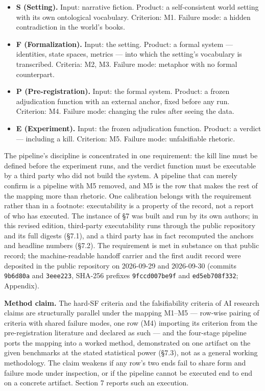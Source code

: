 \documentclass[11pt,a4paper]{article}
\begin{document}
\begin{itemize}[leftmargin=1.6em,itemsep=2pt,parsep=0pt,topsep=3pt]
\item \textbf{S (Setting).} Input: narrative fiction. Product: a self-consistent world setting with its own ontological vocabulary. Criterion: M1. Failure mode: a hidden contradiction in the world's books.
\item \textbf{F (Formalization).} Input: the setting. Product: a formal system — identities, state spaces, metrics — into which the setting's vocabulary is transcribed. Criteria: M2, M3. Failure mode: metaphor with no formal counterpart.
\item \textbf{P (Pre-registration).} Input: the formal system. Product: a frozen adjudication function with an external anchor, fixed before any run. Criterion: M4. Failure mode: changing the rules after seeing the data.
\item \textbf{E (Experiment).} Input: the frozen adjudication function. Product: a verdict — including a kill. Criterion: M5. Failure mode: unfalsifiable rhetoric.
\end{itemize}

The pipeline's discipline is concentrated in one requirement: the kill line must be defined before the experiment runs, and the verdict function must be executable by a third party who did not build the system. A pipeline that can merely confirm is a pipeline with M5 removed, and M5 is the row that makes the rest of the mapping more than rhetoric. One calibration belongs with the requirement rather than in a footnote: executability is a property of the record, not a report of who has executed. The instance of §7 was built and run by its own authors; in this revised edition, third-party executability runs through the public repository and its full digests (§7.1), and a third party has in fact recomputed the anchors and headline numbers (§7.2). The requirement is met in substance on that public record; the machine-readable handoff carrier and the first audit record were deposited in the public repository on 2026-09-29 and 2026-09-30 (commits \texttt{9b6d80a} and \texttt{3eee223}, SHA-256 prefixes \texttt{9fccd007be9f} and \texttt{ed5eb708f332}; Appendix).

\textbf{Method claim.} The hard-SF criteria and the falsifiability criteria of AI research claims are structurally parallel under the mapping M1–M5 — row-wise pairing of criteria with shared failure modes, one row (M4) importing its criterion from the pre-registration literature and declared as such — and the four-stage pipeline ports the mapping into a worked method, demonstrated on one artifact on the given benchmarks at the stated statistical power (§7.3), not as a general working methodology. The claim weakens if any row's two ends fail to share form and failure mode under inspection, or if the pipeline cannot be executed end to end on a concrete artifact. Section 7 reports such an execution.
\end{document}
